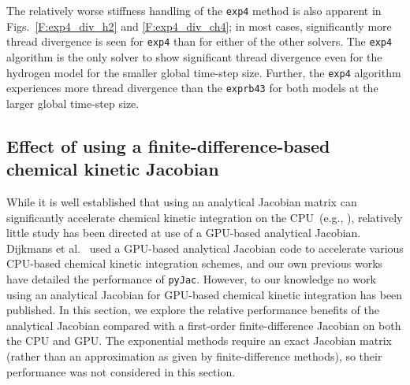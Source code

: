 \documentclass[preprint,review,11pt]{elsarticle}
\begin{document}
The relatively worse stiffness handling of the \texttt{exp4} method is also apparent in Figs.~\ref{F:exp4_div_h2} and \ref{F:exp4_div_ch4}; in most cases, significantly more thread divergence is seen for \texttt{exp4} than for either of the other solvers.
The \texttt{exp4} algorithm is the only solver to show significant thread divergence even for the hydrogen model for the smaller global time-step size.
Further, the \texttt{exp4} algorithm experiences more thread divergence than the \texttt{exprb43} for both models at the larger global time-step size.

\subsection{Effect of using a finite-difference-based chemical kinetic Jacobian}

While it is well established that using an analytical Jacobian matrix can significantly accelerate chemical kinetic integration on the CPU~(e.g., \cite{Lu:2009gh,stone2014comparison,Schwer2002270}), relatively little study has been directed at use of a GPU-based analytical Jacobian.
Dijkmans et al.~\cite{Dijkmans:2014bb} used a GPU-based analytical Jacobian code to accelerate various CPU-based chemical kinetic integration schemes, and our own previous works~\cite{Niemeyer:2016aa,Niemeyer:2015ws} have detailed the performance of \texttt{pyJac}.
However, to our knowledge no work using an analytical Jacobian for GPU-based chemical kinetic integration has been published.
In this section, we explore the relative performance benefits of the analytical Jacobian compared with a first-order finite-difference Jacobian on both the CPU and GPU.
The exponential methods require an exact Jacobian matrix (rather than an approximation as given by finite-difference methods), so their performance was not considered in this section.
\end{document}
